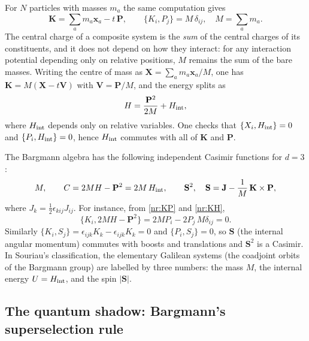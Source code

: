 For $N$ particles with masses $m_a$ the same computation gives
\begin{equation}
  \mathbf{K}=\sum_a m_a\mathbf{x}_a-t\,\mathbf{P},\qquad
  \{K_i,P_j\}=M\,\delta_{ij},\quad M=\sum_a m_a .
  \label{nr:Mtotal}
\end{equation}
The central charge of a composite system is the \emph{sum} of the central
charges of its constituents, and it does not depend on how they interact: for
any interaction potential depending only on relative positions, $M$ remains the
sum of the bare masses. Writing the centre of mass as
$\mathbf{X}=\sum_a m_a\mathbf{x}_a/M$, one has $\mathbf{K}=M(\mathbf{X}-t\mathbf{V})$
with $\mathbf{V}=\mathbf{P}/M$, and the energy splits as
\begin{equation}
  H=\frac{\mathbf{P}^2}{2M}+H_{\rm int},
  \label{nr:Hint}
\end{equation}
where $H_{\rm int}$ depends only on relative variables. One checks that
$\{X_i,H_{\rm int}\}=0$ and $\{P_i,H_{\rm int}\}=0$, hence $H_{\rm int}$
commutes with all of $\mathbf{K}$ and $\mathbf{P}$.

The Bargmann algebra has the following independent Casimir functions for $d=3$:
\begin{equation}
  M,\qquad
  C=2MH-\mathbf{P}^2=2M\,H_{\rm int},\qquad
  \mathbf{S}^2,\quad \mathbf{S}=\mathbf{J}-\frac1M\,\mathbf{K}\times\mathbf{P},
  \label{nr:Casimirs}
\end{equation}
where $J_k=\tfrac12\epsilon_{kij}J_{ij}$. For instance, from \eqref{nr:KP} and
\eqref{nr:KH},
\[
  \{K_i,2MH-\mathbf{P}^2\}=2M P_i-2P_j\,M\delta_{ij}=0 .
\]
Similarly $\{K_i,S_j\}=\epsilon_{ijk}K_k-\epsilon_{ijk}K_k=0$ and
$\{P_i,S_j\}=0$, so $\mathbf{S}$ (the internal angular momentum) commutes with
boosts and translations and $\mathbf{S}^2$ is a Casimir. In Souriau's
classification, the elementary Galilean systems (the coadjoint orbits of the
Bargmann group) are labelled by three numbers: the mass $M$, the internal
energy $U=H_{\rm int}$, and the spin $|\mathbf{S}|$.

\subsection{The quantum shadow: Bargmann's superselection rule}

